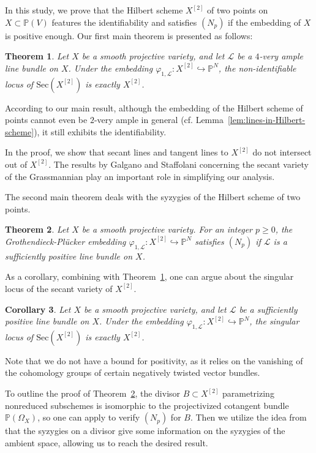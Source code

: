 \documentclass[a4paper]{amsart}
\numberwithin{equation}{section}
\theoremstyle{plain}
\newtheorem{thm}{Theorem}[section]
\newtheorem{cor}[thm]{Corollary}
\theoremstyle{definition}
\theoremstyle{remark}
\numberwithin{figure}{section}
\numberwithin{table}{section}
\numberwithin{equation}{section}
\def \PP {\mathbb{P}}
\def \Lcal {\mathcal{L}}
\begin{document}
In this study, we prove that the Hilbert scheme $X^{[2]}$ of two points on $X \subset \PP(V)$ features the identifiability and satisfies $(N_p)$ if the embedding of $X$ is positive enough.
Our first main theorem is presented as follows:

\begin{thm} \label{thm:main-theorem-1}
    Let $X$ be a smooth projective variety, and let $\Lcal$ be a $4$-very ample line bundle on $X$.
    Under the embedding $\varphi_{1, \Lcal}:X^{[2]} \hookrightarrow \PP^N$, the non-identifiable locus of $\mathrm{Sec} (X^{[2]})$ is exactly $X^{[2]}$.
\end{thm}

According to our main result, although the embedding of the Hilbert scheme of points cannot even be $2$-very ample in general (cf. Lemma~\ref{lem:lines-in-Hilbert-scheme}), it still exhibits the identifiability.

In the proof, we show that secant lines and tangent lines to $X^{[2]}$ do not intersect out of $X^{[2]}$.
The results by Galgano and Staffolani \cite{GS2022} concerning the secant variety of the Grassmannian play an important role in simplifying our analysis.

The second main theorem deals with the syzygies of the Hilbert scheme of two points.

\begin{thm} \label{thm:main-theorem-2}
    Let $X$ be a smooth projective variety.
    For an integer $p \geq 0$, the Grothendieck-Pl\"ucker embedding $\varphi_{1,\Lcal}: X^{[2]} \hookrightarrow \PP^N$ satisfies $(N_p)$ if $\Lcal$ is a sufficiently positive line bundle on $X$.
\end{thm}

As a corollary, combining with Theorem~\ref{thm:main-theorem-1}, one can argue about the singular locus of the secant variety of $X^{[2]}$.

\begin{cor} \label{cor:main-theorem-3}
    Let $X$ be a smooth projective variety, and let $\Lcal$ be a sufficiently positive line bundle on $X$.
    Under the embedding $\varphi_{1,\Lcal}:X^{[2]} \hookrightarrow \PP^N$, the singular locus of $\mathrm{Sec}(X^{[2]})$ is exactly $X^{[2]}$.
\end{cor}

Note that we do not have a bound for positivity, as it relies on the vanishing of the cohomology groups of certain negatively twisted vector bundles.

To outline the proof of Theorem~\ref{thm:main-theorem-2}, the divisor $B \subset X^{[2]}$ parametrizing nonreduced subschemes is isomorphic to the projectivized cotangent bundle $\PP(\Omega_X)$, so one can apply \cite{Park2007} to verify $(N_p)$ for $B$.
Then we utilize the idea from \cite[Observation~1.3]{GP2000} that the syzygies on a divisor give some information on the syzygies of the ambient space, allowing us to reach the desired result.
\end{document}
